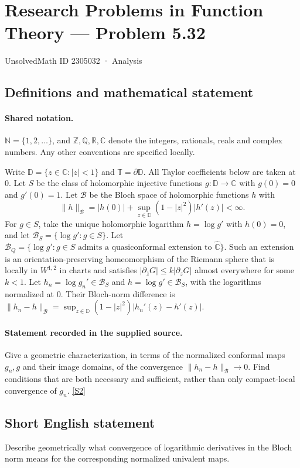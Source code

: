 \documentclass[11pt]{article}
\newcommand{\sref}[2]{\hyperlink{source:#1:#2}{[S#2]}}
\begin{document}
\setcounter{section}{2305031}
\section{Research Problems in Function Theory — Problem 5.32}\label{2305032}
{\small\sffamily UnsolvedMath ID 2305032 · Analysis}
\subsection{Definitions and mathematical statement}

\paragraph{Shared notation.}$\mathbb N=\{1,2,\ldots\}$, and $\mathbb Z,\mathbb Q,\mathbb R,\mathbb C$ denote the integers, rationals, reals and complex numbers. Any other conventions are specified locally.


Write $\mathbb D=\{z\in\mathbb C:|z|<1\}$ and $\mathbb T=\partial\mathbb D$. All Taylor coefficients below are taken at $0$. Let $S$ be the class of holomorphic injective functions $g:\mathbb D\to\mathbb C$ with $g(0)=0$ and $g'(0)=1$. Let $\mathcal B$ be the Bloch space of holomorphic functions $h$ with
\[\|h\|_{\mathcal B}=|h(0)|+\sup_{z\in\mathbb D}(1-|z|^2)|h'(z)|<\infty.
\]
For $g\in S$, take the unique holomorphic logarithm $h=\log g'$ with $h(0)=0$, and let $\mathcal B_S=\{\log g':g\in S\}$. Let $\mathcal B_Q=\{\log g':g\in S\text{ admits a quasiconformal extension to }\widehat{\mathbb C}\}$. Such an extension is an orientation-preserving homeomorphism of the Riemann sphere that is locally in $W^{1,2}$ in charts and satisfies $|\partial_{\bar z}G|\le k|\partial_zG|$ almost everywhere for some $k<1$. Let $h_n=\log g_n'\in\mathcal B_S$ and $h=\log g'\in\mathcal B_S$, with the logarithms normalized at $0$. Their Bloch-norm difference is $\|h_n-h\|_{\mathcal B}=\sup_{z\in\mathbb D}(1-|z|^2)|h_n'(z)-h'(z)|$.
\paragraph{Statement recorded in the supplied source.}
Give a geometric characterization, in terms of the normalized conformal maps $g_n,g$ and their image domains, of the convergence $\|h_n-h\|_{\mathcal B}\to0$. Find conditions that are both necessary and sufficient, rather than only compact-local convergence of $g_n$. \sref{2305032}{2}
\subsection{Short English statement}
Describe geometrically what convergence of logarithmic derivatives in the Bloch norm means for the corresponding normalized univalent maps.
\end{document}
